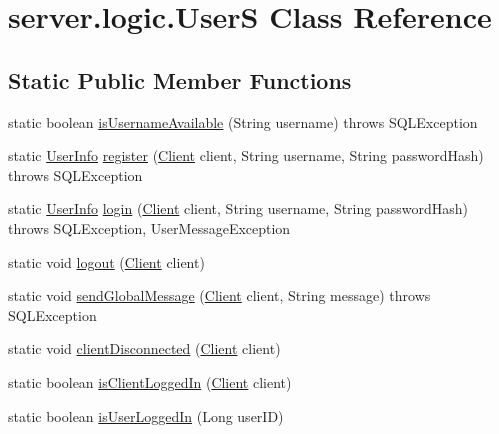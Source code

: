 \hypertarget{classserver_1_1logic_1_1_user_s}{}\section{server.\+logic.\+UserS Class Reference}
\label{classserver_1_1logic_1_1_user_s}
\subsection*{Static Public Member Functions}
\begin{DoxyCompactItemize}
\item 
static boolean \hyperlink{classserver_1_1logic_1_1_user_s_a33903c8aa907a94d28bfa4e5200de5c0}{is\+Username\+Available} (String username)  throws S\+Q\+L\+Exception 
\item 
static \hyperlink{classsharedlib_1_1tuples_1_1_user_info}{User\+Info} \hyperlink{classserver_1_1logic_1_1_user_s_a2ab851cb6f642119c3abbae9cb4d6e0a}{register} (\hyperlink{classserver_1_1conn_1_1_client}{Client} client, String username, String password\+Hash)  throws S\+Q\+L\+Exception 
\item 
static \hyperlink{classsharedlib_1_1tuples_1_1_user_info}{User\+Info} \hyperlink{classserver_1_1logic_1_1_user_s_a341ba5a2821e041762a4ca53a0c7b4b2}{login} (\hyperlink{classserver_1_1conn_1_1_client}{Client} client, String username, String password\+Hash)  throws S\+Q\+L\+Exception, User\+Message\+Exception 
\item 
static void \hyperlink{classserver_1_1logic_1_1_user_s_a8048a38381a80d7a1fd9577bf5aa74be}{logout} (\hyperlink{classserver_1_1conn_1_1_client}{Client} client)
\item 
static void \hyperlink{classserver_1_1logic_1_1_user_s_a82e1f4a79b818f0418c7b3626233b8cf}{send\+Global\+Message} (\hyperlink{classserver_1_1conn_1_1_client}{Client} client, String message)  throws S\+Q\+L\+Exception 
\item 
static void \hyperlink{classserver_1_1logic_1_1_user_s_a3d20a83f4f5e05c901e1a7d42f23f83e}{client\+Disconnected} (\hyperlink{classserver_1_1conn_1_1_client}{Client} client)
\item 
static boolean \hyperlink{classserver_1_1logic_1_1_user_s_a3b607236a7ddfef3cbf2eaa4081fad63}{is\+Client\+Logged\+In} (\hyperlink{classserver_1_1conn_1_1_client}{Client} client)
\item 
static boolean \hyperlink{classserver_1_1logic_1_1_user_s_a09f700aec7a39a479f99953248adabd3}{is\+User\+Logged\+In} (Long user\+ID)

\end{DoxyCompactItemize}

